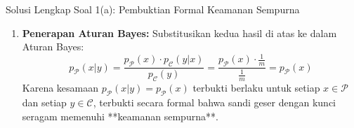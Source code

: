 \documentclass[11pt,a4paper]{article}
\begin{document}
\begin{solusibox}{Solusi Lengkap Soal 1(a): Pembuktian Formal Keamanan Sempurna}
\begin{enumerate}[leftmargin=*]
    \textit{Penjelasan Alternatif Melalui Dekripsi:}
    Jika dihitung melalui ruang kunci:
    \[
    p_{\mathcal{C}}(y) = \sum_{k=0}^{m-1} p_{\mathcal{K}}(k) \cdot p_{\mathcal{P}}(d_k(y)) = \frac{1}{m} \sum_{k=0}^{m-1} p_{\mathcal{P}}((y - k) \bmod m)
    \]
    Pandang fungsi pemetaan indeks $\sigma_y: \mathbb{Z}_m \to \mathbb{Z}_m$ dengan aturan $\sigma_y(k) = (y - k) \bmod m$.
    \begin{itemize}
        \item Fungsi $\sigma_y$ adalah pemetaan injektif: Jika $(y - k_1) \equiv (y - k_2) \pmod m \iff -k_1 \equiv -k_2 \pmod m \iff k_1 \equiv k_2 \pmod m$.
        \item Karena domain dan kodomain berukuran sama ($m$), pemetaan injektif pada himpunan berhingga otomatis bersifat \textbf{bijektif} (sebuah permutasi atas himpunan $\mathbb{Z}_m$).
    \end{itemize}
    Dengan demikian, ketika indeks $k$ berjalan melintasi $\{0, 1, \dots, m-1\}$, nilai $(y - k) \bmod m$ menjelajahi setiap elemen dalam $\mathbb{Z}_m$ tepat satu kali tanpa ada yang terlewat. Akibatnya:
    \[
    \sum_{k=0}^{m-1} p_{\mathcal{P}}((y - k) \bmod m) = \sum_{z \in \mathbb{Z}_m} p_{\mathcal{P}}(z) = 1 \implies p_{\mathcal{C}}(y) = \frac{1}{m}
    \]

    \item \textbf{Penerapan Aturan Bayes:}
    Substitusikan kedua hasil di atas ke dalam Aturan Bayes:
    \[
    p_{\mathcal{P}}(x|y) = \frac{p_{\mathcal{P}}(x) \cdot p_{\mathcal{C}}(y|x)}{p_{\mathcal{C}}(y)} = \frac{p_{\mathcal{P}}(x) \cdot \frac{1}{m}}{\frac{1}{m}} = p_{\mathcal{P}}(x)
    \]
    Karena kesamaan $p_{\mathcal{P}}(x|y) = p_{\mathcal{P}}(x)$ terbukti berlaku untuk setiap $x \in \mathcal{P}$ dan setiap $y \in \mathcal{C}$, terbukti secara formal bahwa sandi geser dengan kunci seragam memenuhi **keamanan sempurna**.
\end{enumerate}
\end{solusibox}

\vspace{0.3cm}
\end{document}
